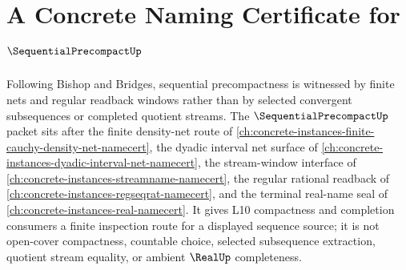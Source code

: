 \chapter{A Concrete Naming Certificate for $\SequentialPrecompactUp$}
\label{ch:concrete-instances-sequential-precompact-namecert}

Following Bishop and Bridges, sequential precompactness is witnessed by finite nets and regular readback windows rather than by selected convergent subsequences or completed quotient streams. The $\SequentialPrecompactUp$ packet sits after the finite density-net route of \autoref{ch:concrete-instances-finite-cauchy-density-net-namecert}, the dyadic interval net surface of \autoref{ch:concrete-instances-dyadic-interval-net-namecert}, the stream-window interface of \autoref{ch:concrete-instances-streamname-namecert}, the regular rational readback of \autoref{ch:concrete-instances-regseqrat-namecert}, and the terminal real-name seal of \autoref{ch:concrete-instances-real-namecert}. It gives L10 compactness and completion consumers a finite inspection route for a displayed sequence source; it is not open-cover compactness, countable choice, selected subsequence extraction, quotient stream equality, or ambient $\RealUp$ completeness.

